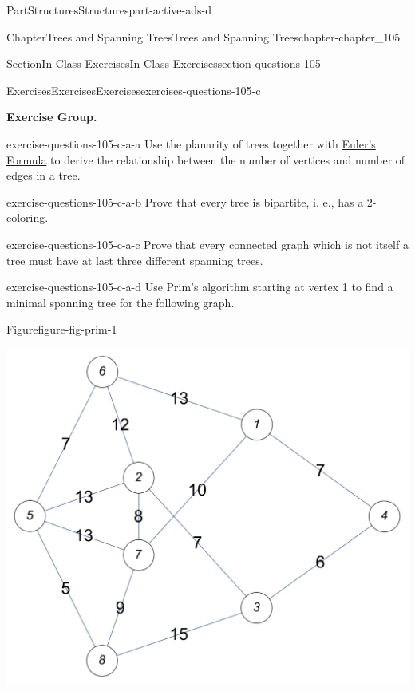 \documentclass[oneside,10pt,]{book}
\numberwithin{equation}{section}
\begin{document}
\begin{partptx}{Part}{Structures}{}{Structures}{}{}{part-active-ads-d}
\begin{chapterptx}{Chapter}{Trees and Spanning Trees}{}{Trees and Spanning Trees}{}{}{chapter-chapter_105}
%
\begin{sectionptx}{Section}{In-Class Exercises}{}{In-Class Exercises}{}{}{section-questions-105}
%
%
%
\typeout{************************************************}
\typeout{************************************************}
%
\begin{exercises-subsection-numberless}{Exercises}{Exercises}{}{Exercises}{}{}{exercises-questions-105-c}
\par\medskip\noindent%
\textbf{Exercise Group.}\space\space%
\begin{exercisegroup}
\begin{divisionexerciseeg}{1}{}{}{exercise-questions-105-c-a-a}%
Use the planarity of trees together with \hyperref[theorem-theorem-euler-formula-statement]{Euler's Formula} to derive the relationship between the number of vertices and number of edges in a tree.%
\end{divisionexerciseeg}%
\begin{divisionexerciseeg}{2}{}{}{exercise-questions-105-c-a-b}%
Prove that every tree is bipartite, i. e., has a 2-coloring.%
\end{divisionexerciseeg}%
\begin{divisionexerciseeg}{3}{}{}{exercise-questions-105-c-a-c}%
Prove that every connected graph which is not itself a tree must have at last three different spanning trees.%
\end{divisionexerciseeg}%
\begin{divisionexerciseeg}{4}{}{}{exercise-questions-105-c-a-d}%
Use Prim's algorithm starting at vertex 1 to find a minimal spanning tree for the following graph.%
\begin{figureptx}{Figure}{}{figure-fig-prim-1}{}%
\begin{image}{0.175}{0.65}{0.175}{}%
\includegraphics[width=\linewidth]{images/fig-prim-1.png}

\end{image}
\end{figureptx}
\end{divisionexerciseeg}
\end{exercisegroup}
\end{exercises-subsection-numberless}
\end{sectionptx}
\end{chapterptx}
\end{partptx}
\end{document}
